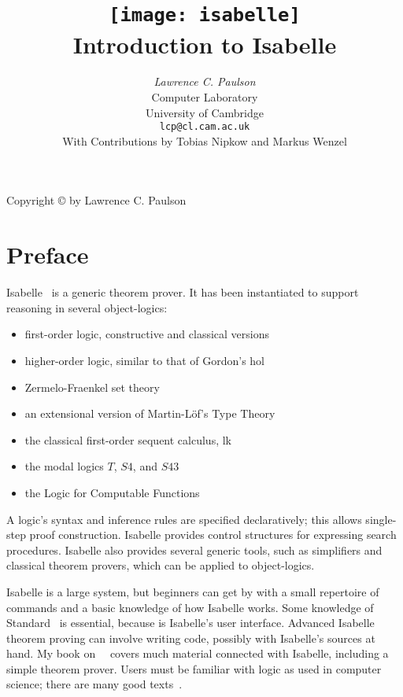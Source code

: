 \documentclass[12pt]{article}
\title{\texttt{[image: isabelle]} \\[4ex] Introduction to Isabelle}
\author{{\em Lawrence C. Paulson}\\
        Computer Laboratory \\ University of Cambridge \\
        \texttt{lcp@cl.cam.ac.uk}\\[3ex] 
        With Contributions by Tobias Nipkow and Markus Wenzel
}
\begin{document}
\pagestyle{empty}
\begin{titlepage}
\maketitle 
\thispagestyle{empty}
\vfill
{\small Copyright \copyright{} \number\year{} by Lawrence C. Paulson}
\end{titlepage}

\pagestyle{headings}
\part*{Preface}
 
Isabelle~\cite{paulson-natural,paulson-found,paulson700} is a generic theorem
prover.  It has been instantiated to support reasoning in several
object-logics:
\begin{itemize}
\item first-order logic, constructive and classical versions
\item higher-order logic, similar to that of Gordon's {\sc
hol}~\cite{mgordon-hol}
\item Zermelo-Fraenkel set theory~\cite{suppes72}
\item an extensional version of Martin-L\"of's Type Theory~\cite{nordstrom90}
\item the classical first-order sequent calculus, {\sc lk}
\item the modal logics $T$, $S4$, and $S43$
\item the Logic for Computable Functions~\cite{paulson87}
\end{itemize}
A logic's syntax and inference rules are specified declaratively; this
allows single-step proof construction.  Isabelle provides control
structures for expressing search procedures.  Isabelle also provides
several generic tools, such as simplifiers and classical theorem provers,
which can be applied to object-logics.

Isabelle is a large system, but beginners can get by with a small
repertoire of commands and a basic knowledge of how Isabelle works.  Some
knowledge of Standard~\ML{} is essential, because \ML{} is Isabelle's user
interface.  Advanced Isabelle theorem proving can involve writing \ML{}
code, possibly with Isabelle's sources at hand.  My book
on~\ML{}~\cite{paulson-ml2} covers much material connected with Isabelle,
including a simple theorem prover.  Users must be familiar with logic as
used in computer science; there are many good
texts~\cite{galton90,reeves90}.
\end{document}

